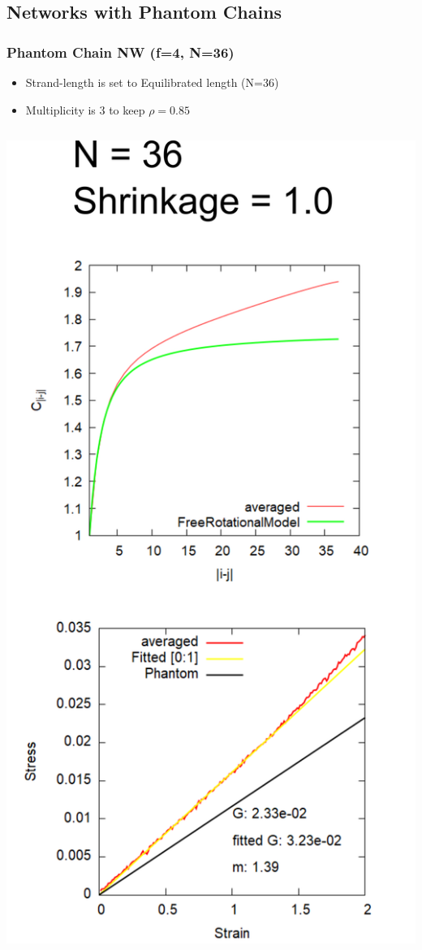 \documentclass[12pt, dvipdfmx]{beamer}
\begin{document}
\subsection{Networks with Phantom Chains}
\begin{frame}
	\frametitle{
		Phantom Chain NW (f=4, N=36)
	}
	\begin{itemize}
		\item Strand-length is set to Equilibrated length (N=36)
		\item Multiplicity is 3 to keep $\rho = 0.85$
	\end{itemize}

	\vspace{3mm}
	\begin{columns}[c, onlytextwidth]
		\centering
		\includegraphics[width=.65\textwidth]{N36_f4.png}
		\centering

\end{columns}
\end{frame}
\end{document}
